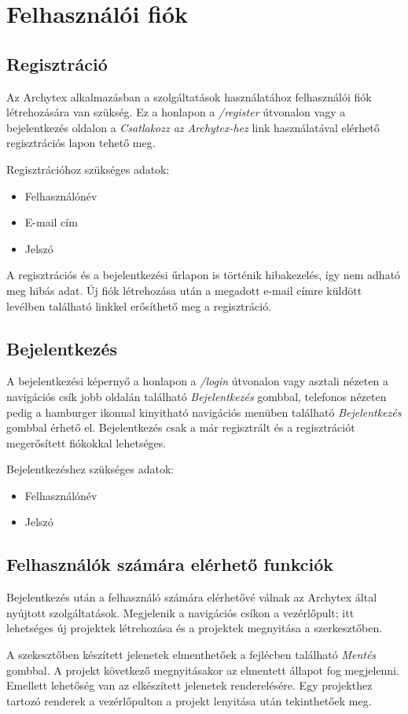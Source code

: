 \section{Felhasználói fiók}

\subsection{Regisztráció}
Az Archytex alkalmazásban a szolgáltatások használatához felhasználói fiók létrehozására van szükség. Ez a honlapon a \emph{/register} útvonalon vagy a bejelentkezés oldalon a \emph{Csatlakozz az Archytex-hez} link használatával elérhető regisztrációs lapon tehető meg.

\begin{samepage}
  \noindent Regisztrációhoz szükséges adatok:
  \begin{itemize}
    \item Felhasználónév
    \item E-mail cím
    \item Jelszó
  \end{itemize}
\end{samepage}

A regisztrációs és a bejelentkezési űrlapon is történik hibakezelés, így nem adható meg hibás adat. Új fiók létrehozása után a megadott e-mail címre küldött levélben található linkkel erősíthető meg a regisztráció.

\subsection{Bejelentkezés}
A bejelentkezési képernyő a honlapon a \emph{/login} útvonalon vagy asztali nézeten a navigációs csík jobb oldalán található \emph{Bejelentkezés} gombbal, telefonos nézeten pedig a hamburger ikonnal kinyitható navigációs menüben található \emph{Bejelentkezés} gombbal érhető el. Bejelentkezés csak a már regisztrált és a regisztrációt megerősített fiókokkal lehetséges.

\begin{samepage}
  \noindent Bejelentkezéshez szükséges adatok:
  \begin{itemize}
    \item Felhasználónév
    \item Jelszó
  \end{itemize}
\end{samepage}

\subsection{Felhasználók számára elérhető funkciók}
Bejelentkezés után a felhasználó számára elérhetővé válnak az Archytex által nyújtott szolgáltatások. Megjelenik a navigációs csíkon a vezérlőpult; itt lehetséges új projektek létrehozása és a projektek megnyitása a szerkesztőben.

A szekesztőben készített jelenetek elmenthetőek a fejlécben található \emph{Mentés} gombbal. A projekt következő megnyitásakor az elmentett állapot fog megjelenni. Emellett lehetőség van az elkészített jelenetek renderelésére. Egy projekthez tartozó renderek a vezérlőpulton a projekt lenyitása után tekinthetőek meg.